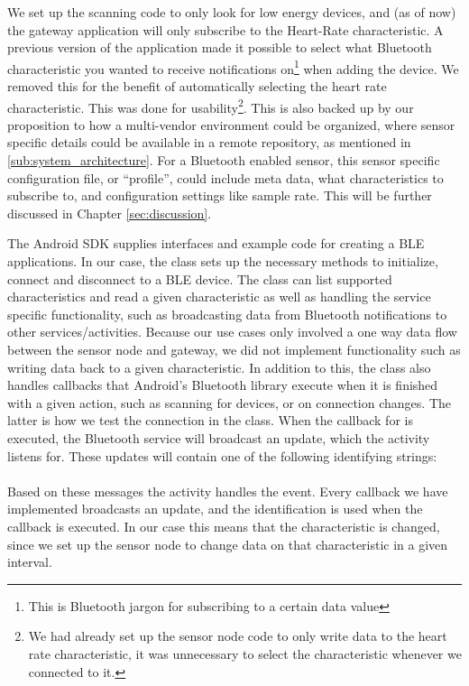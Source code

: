 We set up the scanning code to only look for low energy devices, and (as of now) the gateway application will only subscribe to the Heart-Rate characteristic. A previous version of the application made it possible to select what Bluetooth characteristic you wanted to receive notifications on\footnote{ This is Bluetooth jargon for subscribing to a certain data value} when adding the device. We removed this for the benefit of automatically selecting the heart rate characteristic. This was done for usability\footnote{ We had already set up the sensor node code to only write data to the heart rate characteristic, it was unnecessary to select the characteristic whenever we connected to it.}. This is also backed up by our proposition to how a multi-vendor environment could be organized, where sensor specific details could be available in a remote repository, as mentioned in \ref{sub:system_architecture}. For a Bluetooth enabled sensor, this sensor specific configuration file, or ``profile'', could include meta data, what characteristics to subscribe to, and configuration settings like sample rate. This will be further discussed in Chapter \ref{sec:discussion}.

The Android SDK supplies interfaces and example code for creating a BLE applications. In our case, the  class sets up the necessary methods to initialize, connect and disconnect to a BLE device. The class can list supported characteristics and read a given characteristic as well as handling the service specific functionality, such as broadcasting data from Bluetooth notifications to other services/activities. Because our use cases only involved a one way data flow between the sensor node and gateway, we did not implement functionality such as writing data back to a given characteristic. In addition to this, the class also handles callbacks that Android's Bluetooth library execute when it is finished with a given action, such as scanning for devices, or on connection changes. The latter is how we test the connection in the  class. When the callback for  is executed, the Bluetooth service will broadcast an update, which the  activity listens for. These updates will contain one of the following identifying strings:\\
\newline
\noindent{}
\\
\noindent
Based on these messages the  activity handles the event. Every callback we have implemented broadcasts an update, and the  identification is used when the callback  is executed. In our case this means that the  characteristic is changed, since we set up the sensor node to change data on that characteristic in a given interval.

